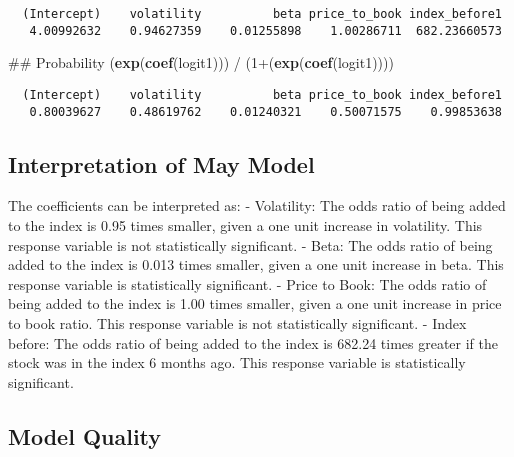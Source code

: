 \documentclass[12pt,twoside]{reedthesis}
\newenvironment{Shaded}{\begin{snugshade}}{\end{snugshade}}
\newcommand{\KeywordTok}[1]{\textcolor[rgb]{0.13,0.29,0.53}{\textbf{{#1}}}}
\newcommand{\DecValTok}[1]{\textcolor[rgb]{0.00,0.00,0.81}{{#1}}}
\newcommand{\StringTok}[1]{\textcolor[rgb]{0.31,0.60,0.02}{{#1}}}
\newcommand{\NormalTok}[1]{{#1}}
\theoremstyle{definition}
\theoremstyle{definition}
\theoremstyle{definition}
\theoremstyle{remark}
\begin{document}
\begin{verbatim}
  (Intercept)    volatility          beta price_to_book index_before1 
   4.00992632    0.94627359    0.01255898    1.00286711  682.23660573 
\end{verbatim}
\begin{Shaded}
\begin{Highlighting}[]
\NormalTok{## Probability }
\NormalTok{(}\KeywordTok{exp}\NormalTok{(}\KeywordTok{coef}\NormalTok{(logit1))) /}\StringTok{ }\NormalTok{(}\DecValTok{1}\NormalTok{+(}\KeywordTok{exp}\NormalTok{(}\KeywordTok{coef}\NormalTok{(logit1))))}
\end{Highlighting}
\end{Shaded}
\begin{verbatim}
  (Intercept)    volatility          beta price_to_book index_before1 
   0.80039627    0.48619762    0.01240321    0.50071575    0.99853638 
\end{verbatim}
\subsection{Interpretation of May
Model}\label{interpretation-of-may-model}

The coefficients can be interpreted as: \hfill\break
- Volatility: The odds ratio of being added to the index is 0.95 times
smaller, given a one unit increase in volatility. This response variable
is not statistically significant. \hfill\break
- Beta: The odds ratio of being added to the index is 0.013 times
smaller, given a one unit increase in beta. This response variable is
statistically significant. \hfill\break
- Price to Book: The odds ratio of being added to the index is 1.00
times smaller, given a one unit increase in price to book ratio. This
response variable is not statistically significant. \hfill\break
- Index before: The odds ratio of being added to the index is 682.24
times greater if the stock was in the index 6 months ago. This response
variable is statistically significant. \hfill\break
\hfill\break

\subsection{Model Quality}\label{model-quality}
\end{document}
